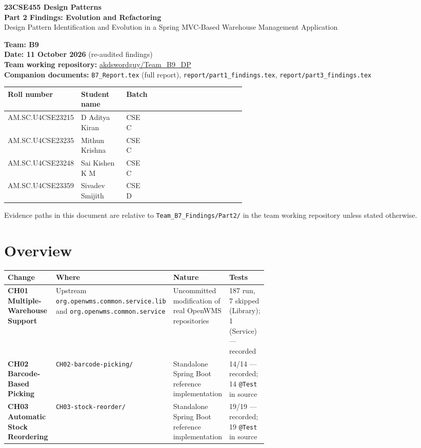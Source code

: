 \documentclass[11pt,a4paper]{article}
\title{}
\author{}
\date{}
\newcommand{\code}[1]{\nolinkurl{#1}}
\begin{document}
\begin{center}
{\Large\textbf{23CSE455 Design Patterns}}\\[4pt]
{\LARGE\textbf{Part 2 Findings: Evolution and Refactoring}}\\[6pt]
{\large Design Pattern Identification and Evolution in a Spring MVC-Based Warehouse Management Application}
\end{center}

\textbf{Team: B9}\\
\textbf{Date: 11 October 2026} (re-audited findings)\\
\textbf{Team working repository:} \href{https://github.com/akdswordguy/Team_B9_DP}{akdswordguy/Team\_B9\_DP}\\
\textbf{Companion documents:} \code{B7_Report.tex} (full report), \code{report/part1_findings.tex}, \code{report/part3_findings.tex}


\begin{tabularx}{\linewidth}{@{}P{0.25\linewidth}P{0.19\linewidth}P{0.10\linewidth}X@{}}
\toprule
Roll number & Student name & Batch \\
\midrule
AM.SC.U4CSE23215 & D Aditya Kiran & CSE C \\
AM.SC.U4CSE23235 & Mithun Krishna & CSE C \\
AM.SC.U4CSE23248 & Sai Kishen K M & CSE C\\
AM.SC.U4CSE23359 & Sivadev Smijith & CSE D \\
\bottomrule
\end{tabularx}

Evidence paths in this document are relative to \code{Team_B7_Findings/Part2/} in the team working repository unless stated otherwise.

\section{Overview}

\begin{tabularx}{\linewidth}{@{}P{0.22\linewidth}P{0.20\linewidth}YP{0.17\linewidth}@{}}
\toprule
Change & Where & Nature & Tests\\
\midrule
\textbf{CH01 Multiple-Warehouse Support} & Upstream \code{org.openwms.common.service.lib} and \code{org.openwms.common.service} & Uncommitted modification of real OpenWMS repositories & 187 run, 7 skipped (Library); 1 (Service) --- recorded\\
\textbf{CH02 Barcode-Based Picking} & \code{CH02-barcode-picking/} & Standalone Spring Boot reference implementation & 14/14 --- recorded; 14 \code{@Test} in source\\
\textbf{CH03 Automatic Stock Reordering} & \code{CH03-stock-reorder/} & Standalone Spring Boot reference implementation & 19/19 --- recorded; 19 \code{@Test} in source\\
\bottomrule
\end{tabularx}
\end{document}
